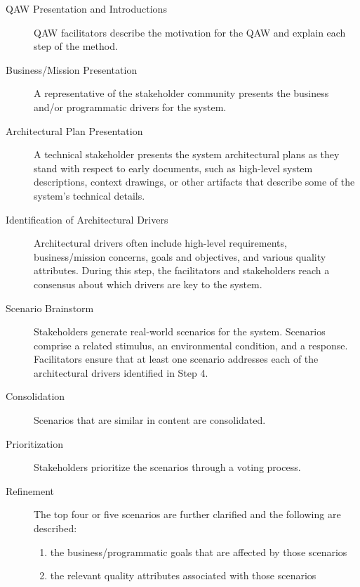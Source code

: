 \begin{description}
    \item [QAW Presentation and Introductions]
        QAW facilitators describe the motivation for the QAW and explain each step of the method. 
    
    \item [Business/Mission Presentation]    
        A representative of the stakeholder community presents the business and/or programmatic drivers for the system.
    
    \item [Architectural Plan Presentation]
        A technical stakeholder presents the system architectural plans as they stand with respect to early documents, such as high-level system descriptions, context drawings, or other artifacts that describe some of the system's technical details.
    
    \item [Identification of Architectural Drivers]
     Architectural drivers often include high-level requirements, business/mission concerns, goals and objectives, and various quality attributes. During this step, the facilitators and stakeholders reach a consensus about which drivers are key to the system.
          
    
    \item [Scenario Brainstorm]
        Stakeholders generate real-world scenarios for the system. Scenarios comprise a related stimulus, an environmental condition, and a response. Facilitators ensure that at least one scenario addresses each of the architectural drivers identified in Step 4.
         
    \item [Consolidation] 
        Scenarios that are similar in content are consolidated.
    
    \item [Prioritization] 
  Stakeholders prioritize the scenarios through a voting process. 
    
    \item [Refinement]
        The top four or five scenarios are further clarified and the following are described:
        \begin{enumerate}
            \item the business/programmatic goals that are affected by those scenarios
            \item the relevant quality attributes associated with those scenarios   
        \end{enumerate}
\end{description}

